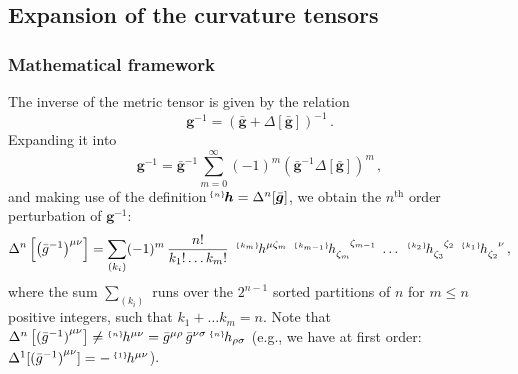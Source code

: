 \documentclass[notitlepage,onecolumn,floatfix,preprintnumbers,aps,prd,showpacs,nofootinbib,amsmath,amssymb,amsfonts]{revtex4-1}
\newcommand{\be}{\begin{equation}}
\newcommand{\ee}{\end{equation}}
\newcommand{\<}{\langle}
\renewcommand{\>}{\rangle}
\newcommand{\pert}[2]{{}^{\mbox{\,\tiny $\{#1\}\!$}}{#2}}
\begin{document}
\subsection{Expansion of the curvature tensors}

\subsubsection{Mathematical framework}

The inverse of the metric tensor is given by the relation 
\be
	{\bm g}^{-1} = \left( \bm{\bar g} +\Delta[\bm{\bar g}] \right)^{-1} \, . 
\ee
Expanding it into 
\be
	{\bm g}^{-1} 
		= \bm{\bar g}^{-1} \sum_{m = 0}^{\infty} (-1)^m \left( {\bm{\bar g}}^{-1} \Delta \left[\bm{\bar g} \right] \right)^m \, , 
\ee
and making use of the definition $\!\! \pert{n}{\bm h} = \Delta^{n}[\bar{\bm g}]$, 
we obtain the $n^{\mathrm{th}}$ order perturbation of ${\bm g}^{-1}$: 
\be
	\Delta^{n}\left[{\left(\bar g^{-1}\right)}^{\mu \nu}\right] 
		= \sum_{(k_i)} (-1)^m \, \frac{n!}{k_1! \dots k_m!} \, 
		\, \pert{k_m}{h^{\mu \zeta_m}} \; \pert{k_{m-1}}{h_{\zeta_m}^{\phantom{\zeta_m} \zeta_{m-1}}} 
		\; \dots \; 
		\pert{k_2}{h_{\zeta_3}^{\phantom{\zeta_3} \zeta_2}} \; \pert{k_1}{h_{\zeta_2}^{\phantom{\zeta_2} \nu}} \, , 
	\label{eq:pert_met}
\ee
where the sum $\sum_{(k_i)}$ runs over the $2^{n - 1}$ sorted partitions of $n$ for $m \le n$ positive integers, 
such that $k_1 + \dots k_m = n$. Note that 
$\Delta^{n} \left[ {(\bar g^{-1})}^{\mu \nu} \right]
\neq \! \pert{n}{h^{\mu \nu} }= \bar g^{\mu \rho} \, \bar g^{\nu \sigma} \pert{n}{h_{\rho \sigma}}$ 
(e.g., we have at first order: $\Delta^1[{(\bar g^{-1})}^{\mu \nu} ] = -\pert{1}{h^{\mu \nu}}$).
\end{document}
